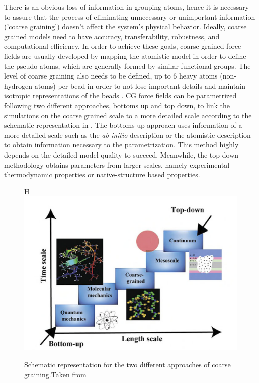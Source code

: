 There is an obvious loss of information in grouping atoms, hence it is necessary to assure that the process of eliminating unnecessary or unimportant information ('coarse graining') doesn't affect the system's physical behavior. Ideally, coarse grained models need to have accuracy, transferability, robustness, and computational efficiency. In order to achieve these goals, coarse grained force fields are usually developed by mapping the atomistic model in order to define the pseudo atoms, which are generally formed by similar functional groups. The level of coarse graining also needs to be defined, up to 6 heavy atoms (non-hydrogen atoms) per bead in order to not lose important details and maintain isotropic representations of the beads \cite{shinoda2007,martini2007,hadley2012}. CG force fields can be parametrized following two different approaches, bottoms up and top down, to link the simulations on the coarse grained scale to a more detailed scale according to the schematic representation in . The bottoms up approach uses information of a more detailed scale such as the \textit{ab initio} description or the atomistic description to obtain information necessary to the parametrization. This method highly depends on the detailed model quality to succeed. Meanwhile, the top down methodology obtains parameters from larger scales, namely experimental thermodynamic properties or native-structure based properties. 

\begin{figure}{H}
	\centering
	\includegraphics[width=0.8\linewidth]{Figures/multiscale}
	\caption{Schematic representation for the two different approaches of coarse graining.Taken from }
	\label{fig:multiscale}
\end{figure}
\FloatBarrier

